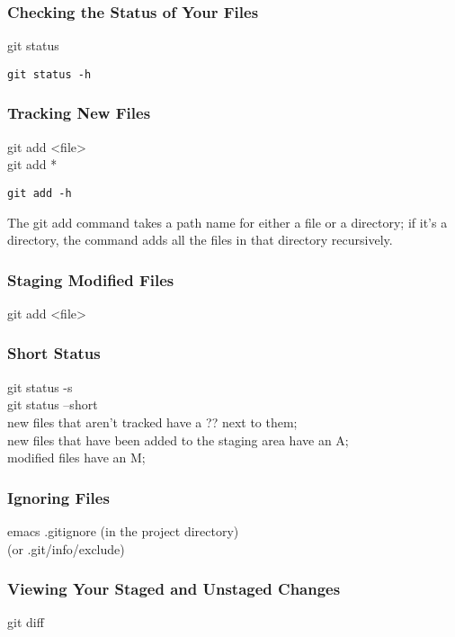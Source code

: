 \documentclass[11pt]{article}
\begin{document}
\subsubsection{Checking the Status of Your Files}
\label{sec:org5a0a6bd}
git status\\
\begin{verbatim}
git status -h
\end{verbatim}

\subsubsection{Tracking New Files}
\label{sec:orgdf4a0ba}
git add <file>\\
git add *\\
\begin{verbatim}
git add -h
\end{verbatim}
The git add command takes a path name for either a file or a directory; if it's a directory, the command adds all the files in that directory recursively.\\

\subsubsection{Staging Modified Files}
\label{sec:org7084704}
git add <file>\\


\subsubsection{Short Status}
\label{sec:org201d1c0}
git status -s\\
git status --short\\

new files that aren't tracked have a ?? next to them;\\
new files that have been added to the staging area have an A;\\
modified files have an M;\\


\subsubsection{Ignoring Files}
\label{sec:org6096ad6}
emacs .gitignore (in the project directory)\\
(or .git/info/exclude)\\


\subsubsection{Viewing Your Staged and Unstaged Changes}
\label{sec:org8badc20}
git diff\\
\end{document}
